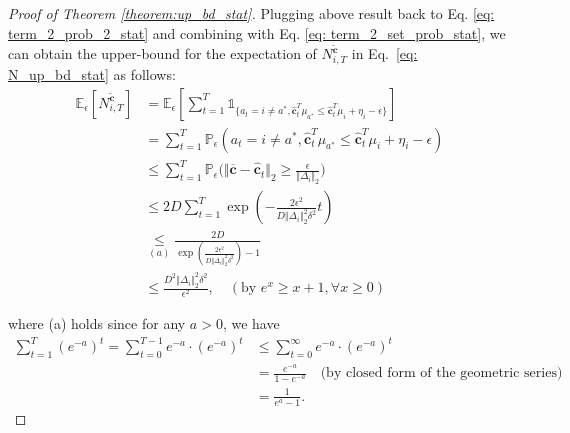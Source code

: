 \begin{proof}[Proof of Theorem \ref{theorem:up_bd_stat}]
Plugging above result back to Eq. \ref{eq: term_2_prob_2_stat} and combining with Eq. \ref{eq: term_2_set_prob_stat}, we can obtain the upper-bound for the expectation of $N_{i,T}^{\widetilde{\boldsymbol{c}}}$ in Eq.~\ref{eq: N_up_bd_stat} as follows:
\begin{equation}
\begin{aligned}
\label{eq: upbd_term_2_stat}
\mathbb{E}_{\epsilon} \left[ N_{i,T}^{\widetilde{\boldsymbol{c}}} \right]
& = 
\mathbb{E}_{\epsilon} \left[ \sum_{t=1}^{T} \mathds{1}_{\{a_t = i \neq a^*, \hat{\boldsymbol{c}}_{t}^{T} \mu_{a^{*}} \leq \hat{\boldsymbol{c}}_{t}^{T} \mu_{i} + \eta_i - \epsilon \}} \right] \\
& = 
\sum_{t=1}^{T} \mathbb{P}_{\epsilon} \left( a_t = i \neq a^*, \hat{\boldsymbol{c}}_{t}^{T} \mu_{a^{*}} \leq \hat{\boldsymbol{c}}_{t}^{T} \mu_{i} + \eta_i - \epsilon \right) \\
& \leq
\sum_{t=1}^{T}
\mathbb{P}_{\epsilon} \bigg( 
\Vert \overline{\boldsymbol{c}} - \hat{\boldsymbol{c}}_t \Vert_2 
\geq \frac{\epsilon}{ \Vert \Delta_{i} \Vert_2 } \bigg) \\ 
& \leq
2 D \sum_{t=1}^{T} \exp \left( - \frac{ 2 \epsilon^2 }{ D \Vert \Delta_{i} \Vert_2^2 \delta^2 } t \right) \\
& \underset{(a)}{\leq}
\frac{2 D}{ \exp \left( \frac{ 2 \epsilon^2 }{ D \Vert \Delta_{i} \Vert_2^2 \delta^2 } \right) -1 }\\
& \leq
\frac{ D^2 \Vert \Delta_{i} \Vert_2^2 \delta^2 }{ \epsilon^2 },
\quad (\text{by } e^x \geq x+1, \forall x \geq 0 )
\end{aligned}
\end{equation} 

where (a) holds since for any $a>0$, we have
\begin{equation}
\begin{aligned}
\label{eq: geometric_converge}
\sum_{t=1}^{T} \left( e^{-a} \right)^{t} 
= 
\sum_{t=0}^{T-1} e^{-a} \cdot \left( e^{-a} \right)^{t} 
& \leq 
\sum_{t=0}^{\infty} e^{-a} \cdot \left( e^{-a} \right)^{t} \\
& = \frac{e^{-a}}{1 - e^{-a}} \quad \text{(by closed form of the geometric series)} \\
& = 
\frac{1}{e^a-1}.
\end{aligned}
\end{equation}


\end{proof}
